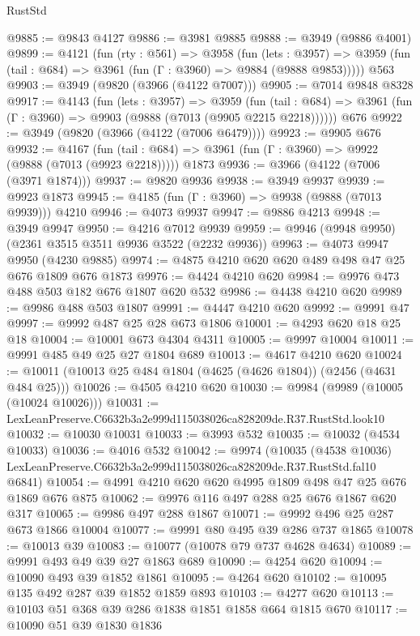 \begin{lexlean}{RustStd}
\begin{coremodule}
@9885 := @9843 @4127
@9886 := @3981 @9885
@9888 := @3949 (@9886 @4001)
@9899 := @4121
    (fun (rty : @561) =>
    @3958
      (fun (lets : @3957) =>
      @3959 (fun (tail : @684) => @3961 (fun (Γ : @3960) => @9884 (@9888 @9853)))))
    @563
@9903 := @3949 (@9820 (@3966 (@4122 @7007)))
@9905 := @7014 @9848 @8328
@9917 := @4143
    (fun (lets : @3957) =>
    @3959
      (fun (tail : @684) => @3961 (fun (Γ : @3960) => @9903 (@9888 (@7013 (@9905 @2215 @2218))))))
    @676
@9922 := @3949 (@9820 (@3966 (@4122 (@7006 @6479))))
@9923 := @9905 @676
@9932 := @4167
    (fun (tail : @684) => @3961 (fun (Γ : @3960) => @9922 (@9888 (@7013 (@9923 @2218)))))
    @1873
@9936 := @3966 (@4122 (@7006 (@3971 @1874)))
@9937 := @9820 @9936
@9938 := @3949 @9937
@9939 := @9923 @1873
@9945 := @4185 (fun (Γ : @3960) => @9938 (@9888 (@7013 @9939))) @4210
@9946 := @4073 @9937
@9947 := @9886 @4213
@9948 := @3949 @9947
@9950 := @4216 @7012 @9939
@9959 := @9946 (@9948 @9950) (@2361 @3515 @3511 @9936 @3522 (@2232 @9936))
@9963 := @4073 @9947 @9950 (@4230 @9885)
@9974 := @4875 @4210 @620 @620 @489 @498 @47 @25 @676 @1809 @676 @1873
@9976 := @4424 @4210 @620
@9984 := @9976 @473 @488 @503 @182 @676 @1807 @620 @532
@9986 := @4438 @4210 @620
@9989 := @9986 @488 @503 @1807
@9991 := @4447 @4210 @620
@9992 := @9991 @47
@9997 := @9992 @487 @25 @28 @673 @1806
@10001 := @4293 @620 @18 @25 @18
@10004 := @10001 @673 @4304 @4311
@10005 := @9997 @10004
@10011 := @9991 @485 @49 @25 @27 @1804 @689
@10013 := @4617 @4210 @620
@10024 := @10011 (@10013 @25 @484 @1804 (@4625 (@4626 @1804)) (@2456 (@4631 @484 @25)))
@10026 := @4505 @4210 @620
@10030 := @9984 (@9989 (@10005 (@10024 @10026)))
@10031 := LexLeanPreserve.C6632b3a2e999d115038026ca828209de.R37.RustStd.look10
@10032 := @10030 @10031
@10033 := @3993 @532
@10035 := @10032 (@4534 @10033)
@10036 := @4016 @532
@10042 := @9974
    (@10035
      (@4538 @10036)
      LexLeanPreserve.C6632b3a2e999d115038026ca828209de.R37.RustStd.fal10
      @6841)
@10054 := @4991 @4210 @620 @620 @4995 @1809 @498 @47 @25 @676 @1869 @676 @875
@10062 := @9976 @116 @497 @288 @25 @676 @1867 @620 @317
@10065 := @9986 @497 @288 @1867
@10071 := @9992 @496 @25 @287 @673 @1866 @10004
@10077 := @9991 @80 @495 @39 @286 @737 @1865
@10078 := @10013 @39
@10083 := @10077 (@10078 @79 @737 @4628 @4634)
@10089 := @9991 @493 @49 @39 @27 @1863 @689
@10090 := @4254 @620
@10094 := @10090 @493 @39 @1852 @1861
@10095 := @4264 @620
@10102 := @10095 @135 @492 @287 @39 @1852 @1859 @893
@10103 := @4277 @620
@10113 := @10103 @51 @368 @39 @286 @1838 @1851 @1858 @664 @1815 @670
@10117 := @10090 @51 @39 @1830 @1836

\end{coremodule}
\end{lexlean}
